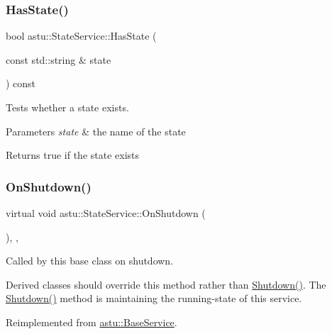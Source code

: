 \subsubsection{\texorpdfstring{Has\+State()}{HasState()}}
{\footnotesize\ttfamily bool astu\+::\+State\+Service\+::\+Has\+State (\begin{DoxyParamCaption}\item[{const std\+::string \&}]{state }\end{DoxyParamCaption}) const}

Tests whether a state exists.


\begin{DoxyParams}{Parameters}
{\em state} & the name of the state \\
\hline
\end{DoxyParams}
\begin{DoxyReturn}{Returns}
{\ttfamily true} if the state exists 
\end{DoxyReturn}
\mbox{\label{classastu_1_1StateService_ad8fa5b6d52bd795ebba450f119540d87}} 
\subsubsection{\texorpdfstring{On\+Shutdown()}{OnShutdown()}}
{\footnotesize\ttfamily virtual void astu\+::\+State\+Service\+::\+On\+Shutdown (\begin{DoxyParamCaption}{ }\end{DoxyParamCaption})\hspace{0.3cm}{\ttfamily [override]}, {\ttfamily [protected]}, {\ttfamily [virtual]}}

Called by this base class on shutdown.

Derived classes should override this method rather than {\ttfamily \hyperlink{classastu_1_1BaseService_a7095888244052db294d58738c0d187fb}{Shutdown()}}. The {\ttfamily \hyperlink{classastu_1_1BaseService_a7095888244052db294d58738c0d187fb}{Shutdown()}} method is maintaining the running-\/state of this service. 

Reimplemented from \hyperlink{classastu_1_1BaseService_aeb5003f7c5efe5412725ac4c66942d03}{astu\+::\+Base\+Service}.

\mbox{\label{classastu_1_1StateService_a06419feca958b72db99dde6eda301f86}} 
